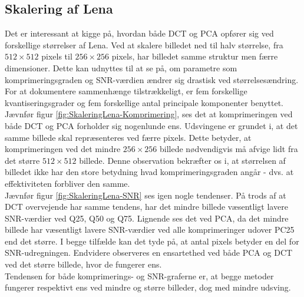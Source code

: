 \subsection{Skalering af Lena}
Det er interessant at kigge på, hvordan både DCT og PCA opfører sig ved forskellige størrelser af Lena. Ved at skalere billedet ned til halv størrelse, fra $512 \times 512$ pixels til $256 \times 256$ pixels, har billedet samme struktur men færre dimensioner. Dette kan udnyttes til at se på, om parametre som komprimeringsgraden og SNR-værdien ændrer sig drastisk ved størrelsesændring. For at dokumentere sammenhænge tilstrækkeligt, er fem forskellige kvantiseringsgrader og fem forskellige antal principale komponenter benyttet. Jævnfør figur \ref{fig:SkaleringLena-Komprimering}, ses det at komprimeringen ved både DCT og PCA forholder sig nogenlunde ens. Udsvingene er grundet i, at det samme billede skal repræsenteres ved færre pixels. Dette betyder, at komprimeringen ved det mindre $256 \times 256$ billede nødvendigvis må afvige lidt fra det større $512 \times 512$ billede. Denne observation bekræfter os i, at størrelsen af billedet ikke har den store betydning hvad komprimeringsgraden angår - dvs. at effektiviteten forbliver den samme. \\
Jævnfør figur \ref{fig:SkaleringLena-SNR} ses igen nogle tendenser. På trods af at DCT overvejende har samme tendens, har det mindre billede væsentligt lavere SNR-værdier ved Q25, Q50 og Q75. Lignende ses det ved PCA, da det mindre billede har væsentligt lavere SNR-værdier ved alle komprimeringer udover PC25 end det større. I begge tilfælde kan det tyde på, at antal pixels betyder en del for SNR-udregningen. Endvidere observeres en ensartethed ved både PCA og DCT ved det større billede, hvor de fungerer ens. \\
Tendensen for både komprimerings- og SNR-graferne er, at begge metoder fungerer respektivt ens ved mindre og større billeder, dog med mindre udsving.

